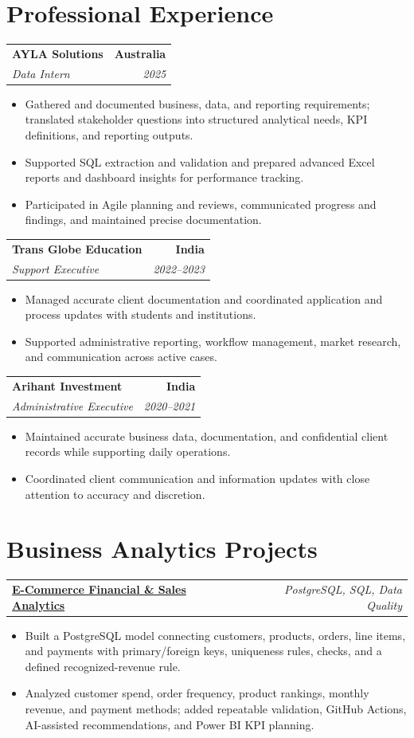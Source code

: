 \documentclass[letterpaper,10pt]{article}
\makeatletter
\newcommand{\role}[4]{%
  \begin{tabularx}{\textwidth}{@{}Xr@{}}
    \textbf{#1} & \textbf{#2} \\
    \textit{#3} & \textit{#4}
  \end{tabularx}\vspace{-1pt}
}
\newcommand{\project}[2]{%
  \begin{tabularx}{\textwidth}{@{}Xr@{}}
    \textbf{#1} & \textit{#2}
  \end{tabularx}\vspace{-1pt}
}
\makeatother
\begin{document}
\section{Professional Experience}
\role{AYLA Solutions}{Australia}{Data Intern}{2025}
\begin{itemize}
  \item Gathered and documented business, data, and reporting requirements; translated stakeholder questions into structured analytical needs, KPI definitions, and reporting outputs.
  \item Supported SQL extraction and validation and prepared advanced Excel reports and dashboard insights for performance tracking.
  \item Participated in Agile planning and reviews, communicated progress and findings, and maintained precise documentation.
\end{itemize}
\vspace{1pt}

\role{Trans Globe Education}{India}{Support Executive}{2022--2023}
\begin{itemize}
  \item Managed accurate client documentation and coordinated application and process updates with students and institutions.
  \item Supported administrative reporting, workflow management, market research, and communication across active cases.
\end{itemize}
\vspace{1pt}

\role{Arihant Investment}{India}{Administrative Executive}{2020--2021}
\begin{itemize}
  \item Maintained accurate business data, documentation, and confidential client records while supporting daily operations.
  \item Coordinated client communication and information updates with close attention to accuracy and discretion.
\end{itemize}

\section{Business Analytics Projects}
\project{\href{https://github.com/jainalimehta/Ecommerce-Sales-Analytics}{E-Commerce Financial \& Sales Analytics}}{PostgreSQL, SQL, Data Quality}
\begin{itemize}
  \item Built a PostgreSQL model connecting customers, products, orders, line items, and payments with primary/foreign keys, uniqueness rules, checks, and a defined recognized-revenue rule.
  \item Analyzed customer spend, order frequency, product rankings, monthly revenue, and payment methods; added repeatable validation, GitHub Actions, AI-assisted recommendations, and Power BI KPI planning.
\end{itemize}
\vspace{1pt}
\end{document}
